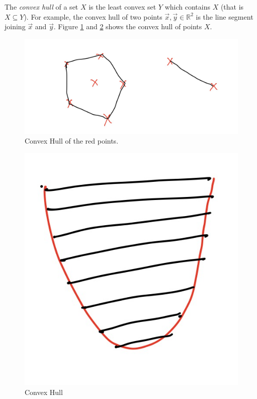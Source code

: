 \documentclass[12pt,
    driverfallback=dvipdfm,
 	openany,
    a4paper,
    toc=bibliography,
    twoside,
    numbers=noenddot]{book}              %
\newcommand{\Reals}{\mathbb{R}}
\begin{document}
The \emph{convex hull} of a set $X$ is the least convex set $Y$ which contains $X$ (that is $X \subseteq Y$).  For example, the convex hull of two points $\vec x, \vec y \in \Reals^2$ is the line segment joining $\vec x$ and $\vec y$. Figure \ref{fig:convexhull1} and \ref{fig:convexhull2} shows the convex hull of points $X$.
\begin{figure}
\includegraphics[scale=0.2]{convexHull.PNG}
\caption{Convex Hull of the red points.}
\label{fig:convexhull1}
\end{figure}
\begin{figure}
\includegraphics[scale=0.2]{convexHull2.PNG}
\caption{Convex Hull}
\label{fig:convexhull2}
\end{figure}
\end{document}
